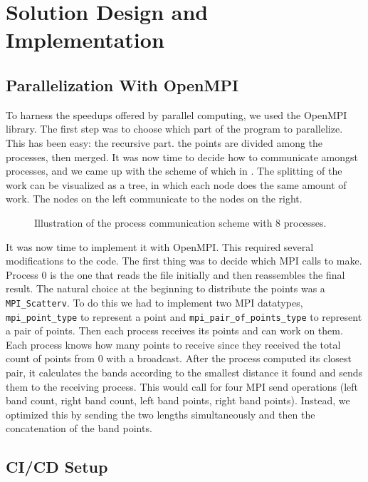 \section{Solution Design and Implementation}
\label{sec:parallelization}

\subsection{Parallelization With OpenMPI}
To harness the speedups offered by parallel computing, we used the OpenMPI library.
The first step was to choose which part of the program to parallelize.
This has been easy: the recursive part.
the points are divided among the processes, then merged.
It was now time to decide how to communicate amongst processes, and we came up with the scheme of which in .
The splitting of the work can be visualized as a tree, in which each node does the same amount of work. The nodes on the left communicate to the nodes on the right.

\begin{figure}[!ht]
    \centering
    
    \caption{Illustration of the process communication scheme with 8 processes.}
    \label{fig:albero_bell_albero}
\end{figure}

It was now time to implement it with OpenMPI. This required several modifications to the code. The first thing was to decide which MPI calls to make.
Process 0 is the one that reads the file initially and then reassembles the final result.
The natural choice at the beginning to distribute the points was a \verb+MPI_Scatterv+. To do this we had to implement two MPI datatypes, \verb+mpi_point_type+ to represent a point and \verb+mpi_pair_of_points_type+
to represent a pair of points.
Then each process receives its points and can work on them. Each process knows how many points to receive since they received the total count of points from 0 with a broadcast.
After the process computed its closest pair, it calculates the bands according to the smallest distance it found and sends them to the receiving process.
This would call for four MPI send operations (left band count, right band count, left band points, right band points). Instead, we optimized this by sending the two lengths simultaneously and then the concatenation of the band points.

\subsection{CI/CD Setup}

